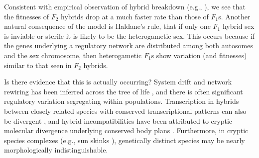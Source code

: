 \documentclass{article}
\newcommand{\plr}[1]{\todo[color=blue!25]{#1}}
\newcommand{\plr}[1]{{\color{blue}\it #1}}
\newcommand{\1}{\mathbbm{1}}
\begin{document}
Consistent with empirical observation of hybrid breakdown (e.g., \citet{plotner2017chlorosis}), 
we see that the fitnesses of $F_2$ hybrids drop at a much faster rate than those of $F_1$s.
Another natural consequence of the model is Haldane's rule,
that if only one $F_1$ hybrid sex is inviable or sterile it is likely to be the heterogametic sex.
This occurs because if the genes underlying a regulatory network are distributed among both autosomes and the sex chromosome, 
then heterogametic $F_1$s show variation (and fitnesses) similar to that seen in $F_2$ hybrids.

Is there evidence that this is actually occurring?
System drift and network rewiring has been inferred across the tree of life \citep{wotton2015quantitative, crombach2016gap, dalal2017transcription, johnson2017rewiring, ali2017quantitative},
and there is often significant regulatory variation segregating within populations.
Transcription in hybrids between closely related species with conserved transcriptional patterns can also be divergent 
\citep{haerty2006gene, maheshwari2012cis, coolon2014tempo, michalak2004association, mack2016gene}, and hybrid incompatibilities have been attributed to cryptic molecular divergence underlying conserved body plans \citep{gavin2013embryonic}. 
Furthermore, in cryptic species complexes (e.g., sun skinks \citep{barley2013challenge}),
genetically distinct species
may be nearly morphologically indistinguishable.
\end{document}
